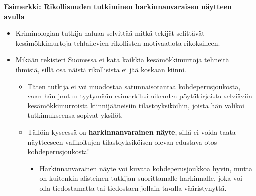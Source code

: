 \documentclass[
]{book}
\providecommand{\tightlist}{%
  \setlength{\itemsep}{0pt}\setlength{\parskip}{0pt}}
\begin{document}
\begin{eblock}{}

\textbf{Esimerkki: Rikollisuuden tutkiminen harkinnanvaraisen näytteen avulla}

\begin{itemize}
\tightlist
\item
  Kriminologian tutkija haluaa selvittää mitkä tekijät selittävät kesämökkimurtoja tehtailevien rikollisten motivaatiota rikoksilleen.
\item
  Mikään rekisteri Suomessa ei kata kaikkia kesämökkimurtoja tehneitä ihmisiä, sillä osa näistä rikollisista ei jää koskaan kiinni.

  \begin{itemize}
  \tightlist
  \item
    Täten tutkija ei voi muodostaa satunnaisotantaa kohdeperusjoukosta, vaan hän joutuu tyytymään esimerkiksi oikeuden pöytäkirjoista selviäviin kesämökkimurroista kiinnijääneisiin tilastoyksiköihin, joista hän valikoi tutkimukseensa sopivat yksilöt.
  \item
    Tällöin kyseessä on \textbf{harkinnanvarainen näyte}, sillä ei voida taata näytteeseen valikoitujen tilastoyksiköisen olevan edustava otos kohdeperusjoukosta!

    \begin{itemize}
    \tightlist
    \item
      Harkinnanvarainen näyte voi kuvata kohdeperusjoukkoa hyvin, mutta on kuitenkin alisteinen tutkijan suorittamalle harkinnalle, joka voi olla tiedostamatta tai tiedostaen jollain tavalla vääristynyttä.
    \end{itemize}
  \end{itemize}
\end{itemize}

\end{eblock}
\end{document}
